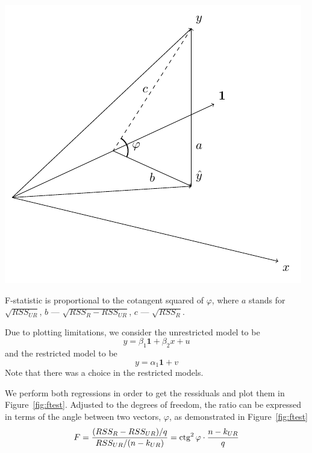 \begin{marginfigure}
\includegraphics[scale=0.55]{figures/04_ftest.pdf}
\caption{F-statistic is proportional to the cotangent squared of $\varphi$,
where $a$ stands for $\sqrt{RSS_{UR}}$, $b$ — $\sqrt{RSS_{R} -RSS_{UR}}$,
$c$ — $\sqrt{RSS_{R}}$.}
\label{fig:ftest}
\end{marginfigure}

Due to plotting limitations, we consider the unrestricted model to be
\[
y = \beta_1 \mathbf{1}+ \beta_2 x + u
\]
and the restricted model to be
\[
y = \alpha_1 \mathbf{1} + v
\]
Note that there was a choice in the restricted models.


We perform both regressions in order to get the ressiduals and plot them
in Figure~\ref{fig:ftest}.
Adjusted to the degrees of freedom, the ratio can be expressed in terms of the
angle between two vectors, $\varphi$, as demonstrated in Figure~\ref{fig:ftest}
\[
F = \frac{(RSS_{R} - RSS_{UR})/q}{RSS_{UR}/(n-k_{UR})} =
\operatorname{ctg}^2 \varphi \cdot \frac{n - k_{UR}}{q}
\]
